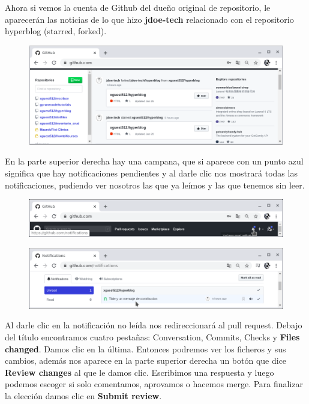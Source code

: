 \documentclass{article}
\begin{document}
Ahora si vemos la cuenta de Github del dueño original de repositorio, le
aparecerán las noticias de lo que hizo \textbf{jdoe-tech} relacionado con el
repositorio hyperblog (starred, forked).

\begin{figure}[h!]
  \centering
  \includegraphics[scale=0.75]{./Pictures/320_notifications.png}
\end{figure}

En la parte superior derecha hay una campana, que si aparece con un punto azul
significa que hay notificaciones pendientes y al darle clic nos mostrará todas
las notificaciones, pudiendo ver nosotros las que ya leímos y las que tenemos
sin leer.

\begin{figure}[h!]
  \centering
  \includegraphics[scale=0.75]{./Pictures/321_notifications.png}
\end{figure}

\begin{figure}[h!]
  \centering
  \includegraphics[scale=0.75]{./Pictures/322_notification.png}
\end{figure}

\newpage

Al darle clic en la notificación no leída nos redireccionará al pull request.
Debajo del título encontramos cuatro pestañas: Conversation, Commits, Checks y
\textbf{Files changed}. Damos clic en la última. Entonces podremos ver los
ficheros y sus cambios, además nos aparece en la parte superior derecha un
botón que dice \textbf{Review changes} al que le damos clic. Escribimos una
respuesta y luego podemos escoger si solo comentamos, aprovamos o hacemos
merge. Para finalizar la elección damos clic en \textbf{Submit review}.
\end{document}

